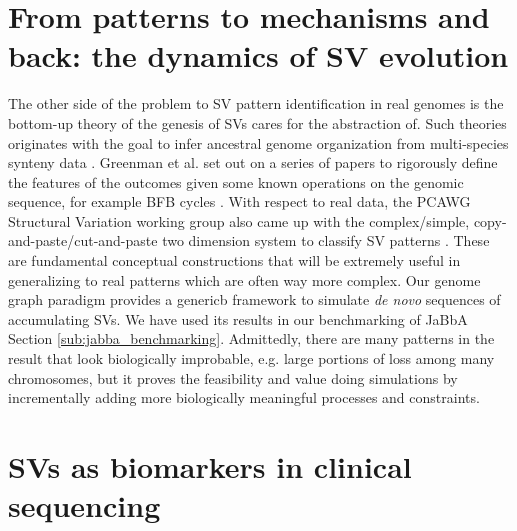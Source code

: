 \documentclass[phd,tocprelim]{cornell}
\begin{document}
\section{From patterns to mechanisms and back: the dynamics of SV evolution}

The other side of the problem to SV pattern identification in real genomes is the bottom-up theory of the genesis of SVs cares for the abstraction of. Such theories originates with the goal to infer ancestral genome organization from multi-species synteny data \cite{Medvedev:2010bm}. Greenman et al. set out on a series of papers to rigorously define the features of the outcomes given some known operations on the genomic sequence, for example BFB cycles \cite{greenman2016-ho}. With respect to real data, the PCAWG Structural Variation working group also came up with the complex/simple, copy-and-paste/cut-and-paste two dimension system to classify SV patterns \cite{Li2020sv}. These are fundamental conceptual constructions that will be extremely useful in generalizing to real patterns which are often way more complex. Our genome graph paradigm provides a genericb framework to simulate \textit{de novo} sequences of accumulating SVs. We have used its results in our benchmarking of JaBbA Section \ref{sub:jabba_benchmarking}. Admittedly, there are many patterns in the result that look biologically improbable, e.g. large portions of loss among many chromosomes, but it proves the feasibility and value doing simulations by incrementally adding more biologically meaningful processes and constraints.


\section{SVs as biomarkers in clinical sequencing}
\end{document}
